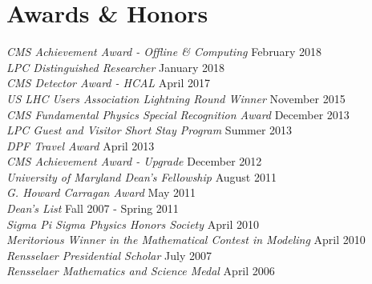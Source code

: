 \section{Awards \& Honors}
{\sl CMS Achievement Award - Offline \& Computing} \hfill February 2018\\
{\sl LPC Distinguished Researcher} \hfill January 2018\\
{\sl CMS Detector Award - HCAL } \hfill April 2017\\
{\sl US LHC Users Association Lightning Round Winner} \hfill November 2015\\
{\sl CMS Fundamental Physics Special Recognition Award} \hfill December 2013\\
\ifdefined\longestflag
{\sl LPC Guest and Visitor Short Stay Program} \hfill Summer 2013\\
{\sl DPF Travel Award} \hfill April 2013\\
\fi
{\sl CMS Achievement Award - Upgrade} \hfill December 2012\\
{\sl University of Maryland Dean's Fellowship} \hfill August 2011\\
{\sl G. Howard Carragan Award} \hfill May 2011\\
\ifdefined\longerflag
{\sl Dean's List} \hfill Fall 2007 - Spring 2011\\
{\sl Sigma Pi Sigma Physics Honors Society} \hfill April 2010\\
\fi
{\sl Meritorious Winner in the Mathematical Contest in Modeling} \hfill April 2010\\
{\sl Rensselaer Presidential Scholar} \hfill July 2007\\
{\sl Rensselaer Mathematics and Science Medal} \hfill April 2006%
